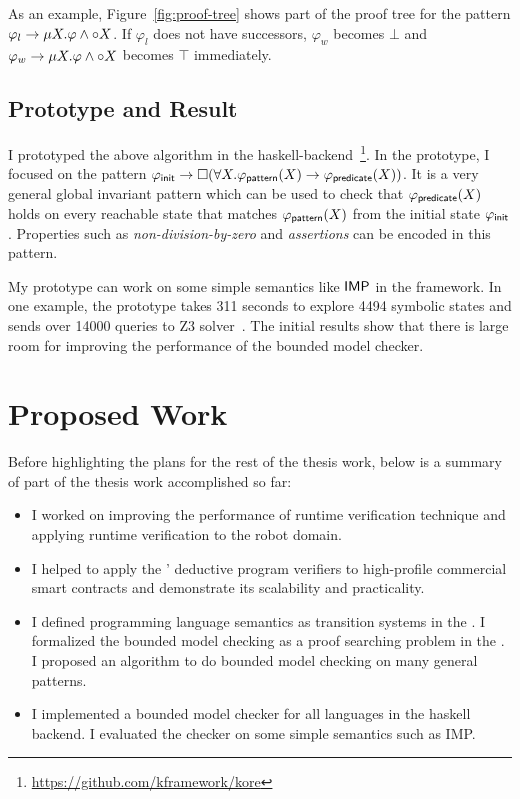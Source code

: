 \documentclass{almostllncs}
\begin{document}
As an example, Figure~\ref{fig:proof-tree} shows part of the proof tree for the pattern $\varphi_l \to \mu X \mathord{.} \varphi \wedge {\circ} X$.
If $\varphi_l$ does not have successors, $\varphi_w$ becomes $\bot$ and $\varphi_w \to \mu X \mathord{.} \varphi \wedge {\circ} X$ becomes $\top$ immediately.

\subsection{Prototype and Result}
I prototyped the above algorithm in the \K haskell-backend~\footnote{\url{https://github.com/kframework/kore}}.
In the prototype, I focused on the pattern $\varphi_{\textnormal{\textsf{init}}} \to {\square} (\forall X \mathord{.} \varphi_{\textnormal{\textsf{pattern}}}(X) \to \varphi_{\textnormal{\textsf{predicate}}}(X))$.
It is a very general global invariant pattern which can be used to check that $\varphi_{\textnormal{\textsf{predicate}}}(X)$ holds on every reachable state that matches $\varphi_{\textnormal{\textsf{pattern}}}(X)$ from the initial state $\varphi_{\textnormal{\textsf{init}}}$.
Properties such as \emph{non-division-by-zero} and \emph{assertions} can be encoded in this pattern.

My prototype can work on some simple semantics like ${\mathsf{IMP}}$ in the \K framework.
In one example, the prototype takes 311 seconds to explore 4494 symbolic states and sends over 14000 queries to Z3 solver~\cite{DBLP:conf/tacas/MouraB08}.
The initial results show that there is large room for improving the performance of the bounded model checker.

\section{Proposed Work}

Before highlighting the plans for the rest of the thesis work, below is a summary of part of the thesis work accomplished so far:

\begin{itemize}
\item I worked on improving the performance of runtime verification technique and applying runtime verification to the robot domain.
\item I helped to apply the \K' deductive program verifiers to high-profile commercial smart contracts and demonstrate its scalability and practicality.
\item I defined programming language semantics as transition systems in the \mmul.
I formalized the bounded model checking as a proof searching problem in the \mmul.
I proposed an algorithm to do bounded model checking on many general patterns.
\item I implemented a bounded model checker for all languages in the \K haskell backend.
I evaluated the checker on some simple semantics such as IMP.
\end{itemize}
\end{document}
